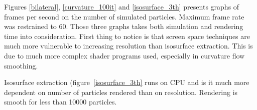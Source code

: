 
Figures \ref{bilateral}, \ref{curvature_100it} and \ref{isosurface_3th} presents graphs of frames per second on the number of simulated particles. Maximum frame rate was restrained to 60. Those three graphs takes both simulation and rendering time into consideration. First thing to notice is that screen space techniques are much more vulnerable to increasing resolution than isosurface extraction. This is due to much more complex shader programs used, especially in curvature flow smoothing. 

Isosurface extraction (figure~\ref{isosurface_3th} runs on CPU and is it much more dependent on number of particles rendered than on resolution. Rendering is smooth for less than 10000 particles. 

